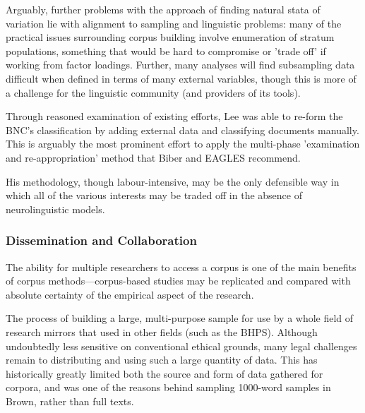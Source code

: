 Arguably, further problems with the approach of finding natural stata of variation lie with alignment to sampling and linguistic problems: many of the practical issues surrounding corpus building involve enumeration of stratum populations, something that would be hard to compromise or 'trade off' if working from factor loadings.  Further, many analyses will find subsampling data difficult when defined in terms of many external variables, though this is more of a challenge for the linguistic community (and providers of its tools).


Through reasoned examination of existing efforts, Lee %
was able to re-form the BNC's classification by adding external data and classifying documents manually.  This is arguably the most prominent effort to apply the multi-phase 'examination and re-appropriation' method that Biber and EAGLES recommend.


His methodology, though labour-intensive, may be the only defensible way in which all of the various interests may be traded off in the absence of neurolinguistic models.  %







\subsubsection{Dissemination and Collaboration}
The ability for multiple researchers to access a corpus is one of the main benefits of corpus methods---corpus-based studies may be replicated and compared with absolute certainty of the empirical aspect of the research.  

The process of building a large, multi-purpose sample for use by a whole field of research mirrors that used in other fields (such as the BHPS). %
Although undoubtedly less sensitive on conventional ethical grounds, many legal challenges remain to distributing and using such a large quantity of data.  This has historically greatly limited both the source and form of data gathered for corpora, and was one of the reasons behind sampling 1000-word samples in Brown, rather than full texts.

